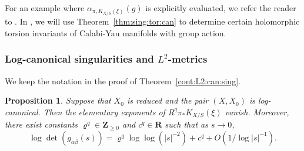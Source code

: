 \documentclass[amscd, leqno]{amsart}
\theoremstyle{plain}
\newtheorem{proposition}[theorem]{Proposition}
\theoremstyle{definition}
\theoremstyle{remark}
\begin{document}
For an example where $\alpha_{\pi, K_{X/S}(\xi)}(g)$ is explicitly evaluated, we refer the reader to \cite[Th.\,6.3]{Yoshikawa04}. 
In \cite{KawaguchiYoshikawa26, Yoshikawa26}, we will use Theorem~\ref{thm:sing:tor:can} to determine certain 
holomorphic torsion invariants of Calabi-Yau manifolds with group action.



\subsubsection
{Log-canonical singularities and $L^{2}$-metrics}
\label{sect:5.3.3}
\par
We keep the notation in the proof of Theorem~\ref{cont:L2:can:sing}.


\begin{proposition}
\label{prop:L2:log:can}
Suppose that $X_{0}$ is reduced and the pair $(X,X_{0})$ is log-canonical. 
Then the elementary exponents of $R^{q}\pi_{*}K_{X/S}(\xi)$ vanish.
Moreover, there exist constants $\varrho^{q} \in {\mathbf Z}_{\geq 0}$ and $c^{q} \in {\mathbf R}$ such that as $s\to0$,
\begin{equation}
\label{eqn:asymptotoc:L2:X:lc}
\log\det ( g_{\alpha\bar{\beta}}(s) )
= \varrho^{q} \log\log(|s|^{-2}) + c^{q} + O(1/\log |s|^{-1}).
\end{equation}
\end{proposition}
\end{document}
